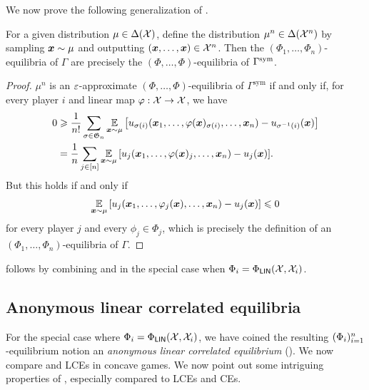 We now prove the following generalization of .
\begin{proposition}\label{prop:symmetry equivalence}
    For a given distribution $\mu \in \Delta({\mathcal{X}})$, define the distribution $\mu^n \in \Delta({\mathcal{X}}^n)$ by sampling ${\bm{x}}\sim\mu$ and outputting $({\bm{x}}, \dots, {\bm{x}}) \in {\mathcal{X}}^n$. Then the $(\Phi_1, \dots, \Phi_n)$-equilibria of $\Gamma$ are precisely the $(\Phi, \dots, \Phi)$-equilibria of $\Gamma^\textup{sym}$.  
\end{proposition}
\begin{proof}
    $\mu^n$ is an $\varepsilon$-approximate $(\Phi, \dots, \Phi)$-equilibria of $\Gamma^\text{sym}$ if and only if, for every player $i$ and linear map $\varphi : {\mathcal{X}} \to {\mathcal{X}}$, we have
    \begin{align*}
        0 &\geqslant \frac{1}{n!} \sum_{\sigma \in \mathfrak{G}_n } \operatorname*{\mathbb E}_{{\bm{x}}\sim\mu} \qty[u_{\sigma(i)}({\bm{x}}_1, \dots, \varphi({\bm{x}})_{\sigma(i)}, \dots, {\bm{x}}_n) - u_{\sigma^{-1}(i)}({\bm{x}})] 
        \\&= \frac{1}{n} \sum_{j \in [n]} \operatorname*{\mathbb E}_{{\bm{x}}\sim\mu} \qty[u_{j}({\bm{x}}_1, \dots, \varphi({\bm{x}})_j, \dots, {\bm{x}}_n) - u_{j}({\bm{x}})] .
    \end{align*}
    But this holds if and only if 
    \begin{align*}
        \operatorname*{\mathbb E}_{{\bm{x}}\sim\mu} \qty[u_{j}({\bm{x}}_1, \dots, \varphi_j({\bm{x}}), \dots, {\bm{x}}_n) - u_{j}({\bm{x}})] \leqslant 0
    \end{align*}
    for every player $j$ and every $\phi_j \in \Phi_j$, which is precisely the definition of an $(\Phi_1, \dots, \Phi_n)$-equilibria of $\Gamma$.
\end{proof}
 follows by combining  and  in the special case when $\Phi_i = \Phi_\mathsf{LIN}({\mathcal{X}}, {\mathcal{X}}_i)$.

\subsection{Anonymous linear correlated equilibria}

For the special case where $\Phi_i = \Phi_\mathsf{LIN}({\mathcal{X}}, {\mathcal{X}}_i)$, we have coined the resulting $(\Phi_i)_{i=1}^n$-equilibrium notion an {\em anonymous linear correlated equilibrium} (\jlce). We now compare \jlces and LCEs in concave games. We now point out some intriguing properties of \jlces, especially compared to LCEs and CEs.

